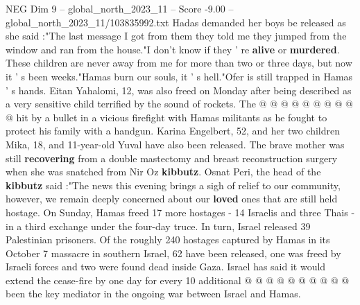 \begin{textsample}{NEG Dim 9 – global\_north\_2023\_11 – Score -9.00 – global\_north\_2023\_11/103835992.txt}
Hadas demanded her boys be released as she said :"The last message I got from them they told me they jumped from the window and ran from the house."I don't know if they ' re \textbf{alive} or \textbf{murdered}.
These children are never away from me for more than two or three days, but now it ' s been weeks."Hamas burn our souls, it ' s hell."Ofer is still trapped in Hamas ' s hands.
Eitan Yahalomi, 12, was also freed on Monday after being described as a very sensitive child terrified by the sound of rockets.
The @ @ @ @ @ @ @ @ @ @ hit by a bullet in a vicious firefight with Hamas militants as he fought to protect his family with a handgun.
Karina Engelbert, 52, and her two children Mika, 18, and 11-year-old Yuval have also been released.
The brave mother was still \textbf{recovering} from a double mastectomy and breast reconstruction surgery when she was snatched from Nir Oz \textbf{kibbutz}.
Osnat Peri, the head of the \textbf{kibbutz} said :"The news this evening brings a sigh of relief to our community, however, we remain deeply concerned about our \textbf{loved} ones that are still held hostage.
On Sunday, Hamas freed 17 more hostages - 14 Israelis and three Thais - in a third exchange under the four-day truce.
In turn, Israel released 39 Palestinian prisoners.
Of the roughly 240 hostages captured by Hamas in its October 7 massacre in southern Israel, 62 have been released, one was freed by Israeli forces and two were found dead inside Gaza.
Israel has said it would extend the cease-fire by one day for every 10 additional @ @ @ @ @ @ @ @ @ @ been the key mediator in the ongoing war between Israel and Hamas.

\end{textsample}
